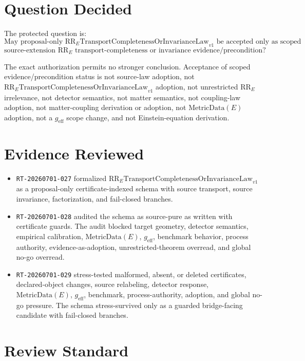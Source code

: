 \documentclass[11pt]{article}
\newcommand{\RRE}{\mathrm{RR}_{E}}
\newcommand{\LawRR}{\mathrm{RR}_{E}\mathrm{TransportCompletenessOrInvarianceLaw}_{v1}}
\newcommand{\MetricData}{\mathrm{MetricData}}
\newcommand{\geff}{g_{\mathrm{eff}}}
\begin{document}
\section{Question Decided}

The protected question is:
\[
\text{May proposal-only } \LawRR \text{ be accepted only as scoped}
\]
\[
\text{source-extension \(\RRE\) transport-completeness or invariance evidence/precondition?}
\]

The exact authorization permits no stronger conclusion. Acceptance of scoped
evidence/precondition status is not source-law adoption, not \(\LawRR\)
adoption, not unrestricted \(\RRE\) irrelevance, not detector semantics, not
matter semantics, not coupling-law adoption, not matter-coupling derivation or
adoption, not \(\MetricData(E)\) adoption, not a \(\geff\) scope change, and
not Einstein-equation derivation.

\section{Evidence Reviewed}

\begin{itemize}[leftmargin=*]
  \item \texttt{RT-20260701-027} formalized \(\LawRR\) as a proposal-only
  certificate-indexed schema with source transport, source invariance,
  factorization, and fail-closed branches.
  \item \texttt{RT-20260701-028} audited the schema as source-pure as written
  with certificate guards. The audit blocked target geometry, detector
  semantics, empirical calibration, \(\MetricData(E)\), \(\geff\), benchmark
  behavior, process authority, evidence-as-adoption, unrestricted-theorem
  overread, and global no-go overread.
  \item \texttt{RT-20260701-029} stress-tested malformed, absent, or deleted
  certificates, declared-object changes, source relabeling, detector response,
  \(\MetricData(E)\), \(\geff\), benchmark, process-authority, adoption, and
  global no-go pressure. The schema stress-survived only as a guarded
  bridge-facing candidate with fail-closed branches.
\end{itemize}

\section{Review Standard}
\end{document}
